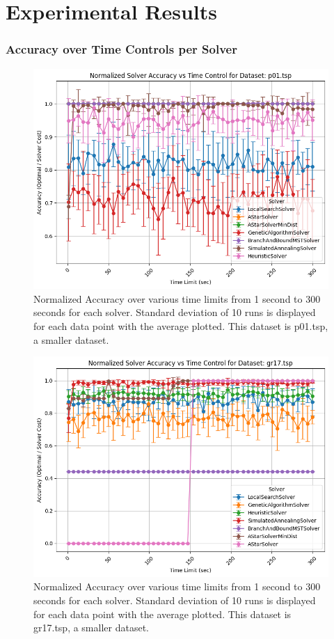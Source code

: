 \documentclass[11pt]{article}
\begin{document}
	\section{Experimental Results}
	\subsubsection{Accuracy over Time Controls per Solver}
	\begin{figure}[H]
		\centering
		\includegraphics[width=0.7\linewidth]{figures/accuracy_line_p01.tsp}
		\caption{Normalized Accuracy over various time limits from 1 second to 300 seconds for each solver. Standard deviation of 10 runs is displayed for each data point with the average plotted. This dataset is p01.tsp, a smaller dataset.}
		\label{fig:accuracylinep01}
	\end{figure}
	\begin{figure}[H]
		\centering
		\includegraphics[width=0.7\linewidth]{figures/accuracy_line_gr17.tsp}
		\caption{Normalized Accuracy over various time limits from 1 second to 300 seconds for each solver. Standard deviation of 10 runs is displayed for each data point with the average plotted. This dataset is gr17.tsp, a smaller dataset.}
		\label{fig:accuracylinegr17}
	\end{figure}
\end{document}
